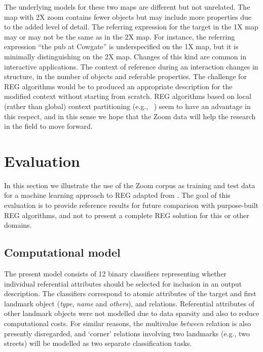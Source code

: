 \documentclass{article}
\begin{document}
The underlying models for these two maps are different but not unrelated. The map with 2X zoom contains fewer objects but may include more properties due to the added level of detail. The  referring expression for the target in the 1X map may or may not be the same as in the 2X map. For instance, the referring expression  ``the pub at Cowgate'' is underspecified on the 1X map, but it is minimally distinguishing on the 2X map. Changes of this kind are common in interactive applications.  The context of reference during an interaction changes in structure, in the number of objects and referable properties. The challenge for REG algorithms would be to produced an appropriate description for the modified context without starting from scratch. REG algorithms based on local (rather than global) context partitioning (e.g., ~\cite{areces08}) seem to have an advantage in this respect, and in this sense we hope that the Zoom data will help the research in the field to move forward.

 


\section{Evaluation}
\label{sec-eval}

In this section we illustrate the use of the Zoom corpus as training and test data for a machine learning approach to REG adapted from \cite{thiago-svm}. The  goal of this evaluation is to provide reference results for future comparison with purpose-built REG algorithms, and not to present a complete REG solution for this or other domains.

\subsection{Computational model}

The present model consists of 12 binary classifiers representing whether individual referential attributes should be selected for inclusion in an output description. The classifiers correspond to atomic attributes of the target and first landmark object ({\em type}, {\em name} and {\em others}), and relations. Referential attributes of other landmark objects were not modelled due to data sparsity and also to reduce computational costs. For similar reasons, the multivalue {\em between} relation is also presently disregarded, and `corner' relations involving two landmarks (e.g., two streets) will be modelled as two separate classification tasks.
\end{document}
